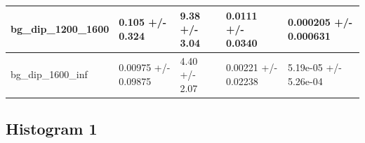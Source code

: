 \documentclass[a4paper, 10pt]{article}
\begin{document}
\begin{table}[H]
\begin{center}
\begin{tabular}{|m{20.0mm}|m{27.0mm}|m{27.0mm}|m{33.0mm}|m{32.0mm}|}
      \hline
      {\cellcolor{white}         bg\_dip\_1200\_1600}& {\cellcolor{white}         0.105 +/\-- 0.324}& {\cellcolor{white}         9.38 +/\-- 3.04}& {\cellcolor{white}         0.0111 +/\-- 0.0340}& {\cellcolor{white}         0.000205 +/\-- 0.000631}\\
      \hline
      {\cellcolor{white}         bg\_dip\_1600\_inf}& {\cellcolor{white}         0.00975 +/\-- 0.09875}& {\cellcolor{white}         4.40 +/\-- 2.07}& {\cellcolor{white}         0.00221 +/\-- 0.02238}& {\cellcolor{white}         5.19e-05 +/\-- 5.26e-04}\\
\hline
    \end{tabular}
  \end{center}
\end{table}

   \newpage
\subsection{ Histogram 1}
\end{document}

